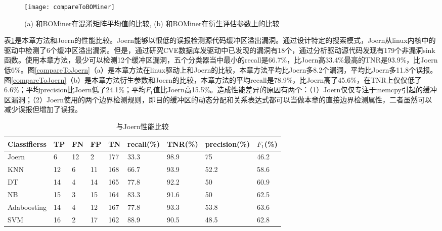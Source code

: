 {\begin{figure}[htb]
\begin{center}
\texttt{[image: compareToBOMiner]}
\end{center}
\caption{(a) 和BOMiner在混淆矩阵平均值的比较, (b) 和BOMiner在衍生评估参数上的比较}
\label{compareToBOMiner}
\end{figure}

表\ref{和Joern的混淆矩阵比较}是本章方法和Joern的性能比较。Joern能够以很低的误报检测源代码缓冲区溢出漏洞。通过设计特定的搜索模式，Joern从linux内核中的驱动中检测了6个缓冲区溢出漏洞。但是，通过研究CVE数据库发驱动中已发现的漏洞有18个，通过分析驱动源代码发现有179个非漏洞sink函数。使用本章方法，最少可以检测12个缓冲区漏洞，五个分类器当中最小的recall是66.7\%，比Joern高33.4\%最高的TNR是93.9\%，比Joern低6\%。图\ref{compareToJoern}（a）是本章方法在linux驱动上和Joern的比较，本章方法平均比Joern多8.2个漏洞，平均比Joern多11.8个误报。图\ref{compareToJoern}（b）是本章方法衍生参数和Joern的比较，本章方法的平均recall是78.9\%，比Joern高了45.6\%，在TNR上仅仅低了6.6\%；平均precision比Joern低了24.1\%；平均$F_1$值比Joern高15.5\%。造成性能差异的原因有两个：（1）Joern仅仅专注于memcpy引起的缓冲区漏洞；（2）Joern使用的两个边界检测规则，即目的缓冲区的动态分配和关系表达式都可以当做本章的直接边界检测属性，二者虽然可以减少误报但增加了误报。

\begin{table}[ht]
\begin{center}
\caption{与Joern性能比较} \label{和Joern的混淆矩阵比较}
\begin{small}
\begin{tabular}{lllllllll}
\hline
 {\bf Classifierss}& {\bf TP} & {\bf FN} & {\bf FP} & {\bf TN} & {\bf recall(\%)} & {\bf TNR(\%)} & {\bf precision(\%)} & {\bf $F_1$(\%)}\\ \hline
Joern & 6 & 12 & 2 & 177 & 33.3 & 98.9 & 75 & 46.2\\ \hline
KNN & 12 & 6 & 11 & 168 & 66.7 & 93.9 & 52.2 & 58.6\\ \hline
DT & 14 & 4 & 14 & 165 & 77.8 & 92.2 & 50 & 60.9\\ \hline
NB & 15 & 3 & 15 & 164 & 83.3 & 91.6 & 50 & 62.5\\ \hline
Adaboosting & 14 & 4 & 12 & 167 & 77.8 & 93.3 & 53.8 & 63.6\\ \hline
SVM & 16 & 2 & 17 & 162 & 88.9 & 90.5 & 48.5 & 62.8\\ \hline
\end{tabular}
\end{small}
\end{center}
\end{table}

}
